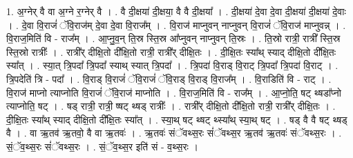 \documentclass[17pt]{extarticle}
\begin{document}
1. अ॒ग्नेर् वै वा अ॒ग्ने र॒ग्नेर् वै । . वै दी॒क्षया॑ दी॒क्षया॒ वै वै दी॒क्षया᳚ । . दी॒क्षया॑ दे॒वा दे॒वा दी॒क्षया॑ दी॒क्षया॑ दे॒वाः । . दे॒वा वि॒राजं॑ ॅवि॒राज॑म् दे॒वा दे॒वा वि॒राज᳚म् । . वि॒राज॑ माप्नुवन् नाप्नुवन् वि॒राजं॑ ॅवि॒राज॑ माप्नुवन्न् । . वि॒राज॒मिति॑ वि - राज᳚म् । . आ॒प्नु॒व॒न् ति॒स्र स्ति॒स्र आ᳚प्नुवन् नाप्नुवन् ति॒स्रः । . ति॒स्रो रात्री॒ रात्री᳚ स्ति॒स्र स्ति॒स्रो रात्रीः᳚ । . रात्री᳚र् दीक्षि॒तो दी᳚क्षि॒तो रात्री॒ रात्री᳚र् दीक्षि॒तः । . दी॒क्षि॒तः स्या᳚थ् स्याद् दीक्षि॒तो दी᳚क्षि॒तः स्या᳚त् । . स्या॒त् त्रि॒पदा᳚ त्रि॒पदा᳚ स्याथ् स्यात् त्रि॒पदा᳚ । . त्रि॒पदा॑ वि॒राड् वि॒राट् त्रि॒पदा᳚ त्रि॒पदा॑ वि॒राट् । . त्रि॒पदेति॑ त्रि - पदा᳚ । . वि॒राड् वि॒राजं॑ ॅवि॒राजं॑ ॅवि॒राड् वि॒राड् वि॒राज᳚म् । . वि॒राडिति॑ वि - राट् । . वि॒राज॑ माप्नो त्याप्नोति वि॒राजं॑ ॅवि॒राज॑ माप्नोति । . वि॒राज॒मिति॑ वि - राज᳚म् । . आ॒प्नो॒ति॒ षट् थ्षडा᳚प्नो त्याप्नोति॒ षट् । . षड् रात्री॒ रात्री॒ ष्षट् थ्षड् रात्रीः᳚ । . रात्री᳚र् दीक्षि॒तो दी᳚क्षि॒तो रात्री॒ रात्री᳚र् दीक्षि॒तः । . दी॒क्षि॒तः स्या᳚थ् स्याद् दीक्षि॒तो दी᳚क्षि॒तः स्या᳚त् । . स्या॒थ् षट् थ्षट् थ्स्या᳚थ् स्या॒थ् षट् । . षड् वै वै षट् थ्षड् वै । . वा ऋ॒तव॑ ऋ॒तवो॒ वै वा ऋ॒तवः॑ । . ऋ॒तवः॑ संॅवथ्स॒रः सं॑ॅवथ्स॒र ऋ॒तव॑ ऋ॒तवः॑ संॅवथ्स॒रः । . सं॒ॅव॒थ्स॒रः सं॑ॅवथ्स॒रः । . सं॒ॅव॒थ्स॒र इति॑ सं - व॒थ्स॒रः । \newline
\end{document}
